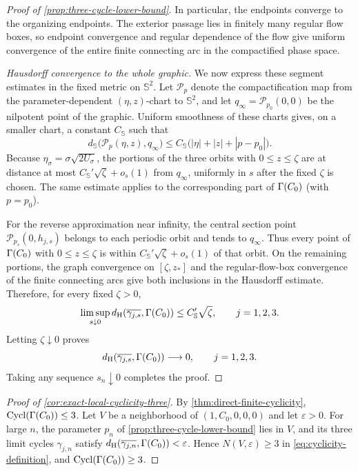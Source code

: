 \begin{proof}[Proof of \cref{prop:three-cycle-lower-bound}]
In particular, the endpoints converge to the organizing endpoints.
The exterior passage lies in finitely many regular flow boxes, so
endpoint convergence and regular dependence of the flow give uniform
convergence of the entire finite connecting arc in the compactified
phase space.

\emph{Hausdorff convergence to the whole graphic.}
We now express these segment estimates in the fixed metric on
\(\mathbb S^2\). Let \(\mathscr P_p\) denote the compactification
map from the parameter-dependent \((\eta,z)\)-chart to \(\mathbb S^2\),
and let \(q_\infty=\mathscr P_{p_0}(0,0)\) be the nilpotent point of the
graphic. Uniform smoothness of these charts gives, on a smaller chart, a
constant \(C_{\mathbb S}\) such that
\begin{equation}
\label{eq:sharpness-sphere-tubular-estimate}
 d_{\mathbb S}\bigl(\mathscr P_p(\eta,z),q_\infty\bigr)
 \le C_{\mathbb S}\bigl(|\eta|+|z|+|p-p_0|\bigr).
\end{equation}
Because \(\eta_\sigma=\sigma\sqrt{2U_\sigma}\), the portions of the
three orbits with \(0\le z\le\zeta\) are at distance at most
\(C_{\mathbb S}'\sqrt{\zeta}+o_s(1)\) from \(q_\infty\), uniformly in
\(s\) after the fixed \(\zeta\) is chosen. The same estimate applies to
the corresponding part of \(\Gamma(C_0)\) (with \(p=p_0\)).

For the reverse approximation near infinity, the central section point
\(\mathscr P_{p_s}(0,h_{j,s})\) belongs to each periodic orbit and tends to
\(q_\infty\). Thus every point of \(\Gamma(C_0)\) with
\(0\le z\le\zeta\) is within
\(C_{\mathbb S}'\sqrt{\zeta}+o_s(1)\) of that orbit.
On the remaining portions, the graph convergence on \([\zeta,z_*]\)
and the regular-flow-box convergence of the finite connecting arcs
give both inclusions in the Hausdorff estimate. Therefore, for every
fixed \(\zeta>0\),
\[
 \limsup_{s\downarrow0}
 d_{\mathrm H}(\overline{\gamma_{j,s}},\Gamma(C_0))
 \le C_{\mathbb S}'\sqrt{\zeta},\qquad j=1,2,3.
\]
Letting \(\zeta\downarrow0\) proves
\[
 d_{\mathrm H}(\overline{\gamma_{j,s}},\Gamma(C_0))\longrightarrow0,
 \qquad j=1,2,3.
\]
Taking any sequence \(s_n\downarrow0\) completes the proof.
\end{proof}

\begin{proof}[Proof of \cref{cor:exact-local-cyclicity-three}]
By \cref{thm:direct-finite-cyclicity}, \(\operatorname{Cycl}(\Gamma(C_0))\le3\).
Let \(V\) be a neighborhood of \((1,C_0,0,0,0)\) and let
\(\varepsilon>0\). For large \(n\), the parameter \(p_n\) of
\cref{prop:three-cycle-lower-bound} lies in \(V\), and its three
limit cycles \(\gamma_{j,n}\) satisfy
\(d_{\mathrm H}(\overline{\gamma_{j,n}},\Gamma(C_0))<\varepsilon\). Hence
\(N(V,\varepsilon)\ge3\) in \eqref{eq:cyclicity-definition}, and
\(\operatorname{Cycl}(\Gamma(C_0))\ge3\).
\end{proof}


